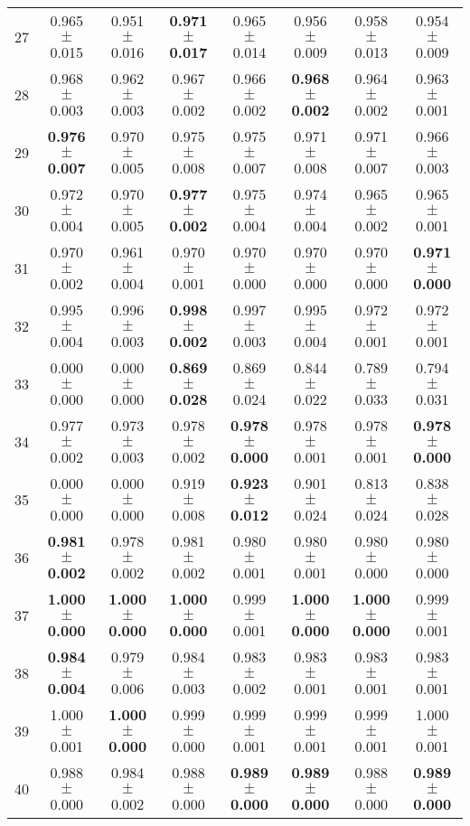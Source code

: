 \begin{table}[!ht]
{\begin{tabular}{r c c c c c c c}
27 & 0.965 $\pm$ 0.015 & 0.951 $\pm$ 0.016 & \textbf{0.971 $\pm$ 0.017} & 0.965 $\pm$ 0.014 & 0.956 $\pm$ 0.009 & 0.958 $\pm$ 0.013 & 0.954 $\pm$ 0.009 \\
28 & 0.968 $\pm$ 0.003 & 0.962 $\pm$ 0.003 & 0.967 $\pm$ 0.002 & 0.966 $\pm$ 0.002 & \textbf{0.968 $\pm$ 0.002} & 0.964 $\pm$ 0.002 & 0.963 $\pm$ 0.001 \\
29 & \textbf{0.976 $\pm$ 0.007} & 0.970 $\pm$ 0.005 & 0.975 $\pm$ 0.008 & 0.975 $\pm$ 0.007 & 0.971 $\pm$ 0.008 & 0.971 $\pm$ 0.007 & 0.966 $\pm$ 0.003 \\
30 & 0.972 $\pm$ 0.004 & 0.970 $\pm$ 0.005 & \textbf{0.977 $\pm$ 0.002} & 0.975 $\pm$ 0.004 & 0.974 $\pm$ 0.004 & 0.965 $\pm$ 0.002 & 0.965 $\pm$ 0.001 \\
31 & 0.970 $\pm$ 0.002 & 0.961 $\pm$ 0.004 & 0.970 $\pm$ 0.001 & 0.970 $\pm$ 0.000 & 0.970 $\pm$ 0.000 & 0.970 $\pm$ 0.000 & \textbf{0.971 $\pm$ 0.000} \\
32 & 0.995 $\pm$ 0.004 & 0.996 $\pm$ 0.003 & \textbf{0.998 $\pm$ 0.002} & 0.997 $\pm$ 0.003 & 0.995 $\pm$ 0.004 & 0.972 $\pm$ 0.001 & 0.972 $\pm$ 0.001 \\
33 & 0.000 $\pm$ 0.000 & 0.000 $\pm$ 0.000 & \textbf{0.869 $\pm$ 0.028} & 0.869 $\pm$ 0.024 & 0.844 $\pm$ 0.022 & 0.789 $\pm$ 0.033 & 0.794 $\pm$ 0.031 \\
34 & 0.977 $\pm$ 0.002 & 0.973 $\pm$ 0.003 & 0.978 $\pm$ 0.002 & \textbf{0.978 $\pm$ 0.000} & 0.978 $\pm$ 0.001 & 0.978 $\pm$ 0.001 & \textbf{0.978 $\pm$ 0.000} \\
35 & 0.000 $\pm$ 0.000 & 0.000 $\pm$ 0.000 & 0.919 $\pm$ 0.008 & \textbf{0.923 $\pm$ 0.012} & 0.901 $\pm$ 0.024 & 0.813 $\pm$ 0.024 & 0.838 $\pm$ 0.028 \\
36 & \textbf{0.981 $\pm$ 0.002} & 0.978 $\pm$ 0.002 & 0.981 $\pm$ 0.002 & 0.980 $\pm$ 0.001 & 0.980 $\pm$ 0.001 & 0.980 $\pm$ 0.000 & 0.980 $\pm$ 0.000 \\
37 & \textbf{1.000 $\pm$ 0.000} & \textbf{1.000 $\pm$ 0.000} & \textbf{1.000 $\pm$ 0.000} & 0.999 $\pm$ 0.001 & \textbf{1.000 $\pm$ 0.000} & \textbf{1.000 $\pm$ 0.000} & 0.999 $\pm$ 0.001 \\
38 & \textbf{0.984 $\pm$ 0.004} & 0.979 $\pm$ 0.006 & 0.984 $\pm$ 0.003 & 0.983 $\pm$ 0.002 & 0.983 $\pm$ 0.001 & 0.983 $\pm$ 0.001 & 0.983 $\pm$ 0.001 \\
39 & 1.000 $\pm$ 0.001 & \textbf{1.000 $\pm$ 0.000} & 0.999 $\pm$ 0.000 & 0.999 $\pm$ 0.001 & 0.999 $\pm$ 0.001 & 0.999 $\pm$ 0.001 & 1.000 $\pm$ 0.001 \\
40 & 0.988 $\pm$ 0.000 & 0.984 $\pm$ 0.002 & 0.988 $\pm$ 0.000 & \textbf{0.989 $\pm$ 0.000} & \textbf{0.989 $\pm$ 0.000} & 0.988 $\pm$ 0.000 & \textbf{0.989 $\pm$ 0.000} \\
\end{tabular}}
\end{table}
